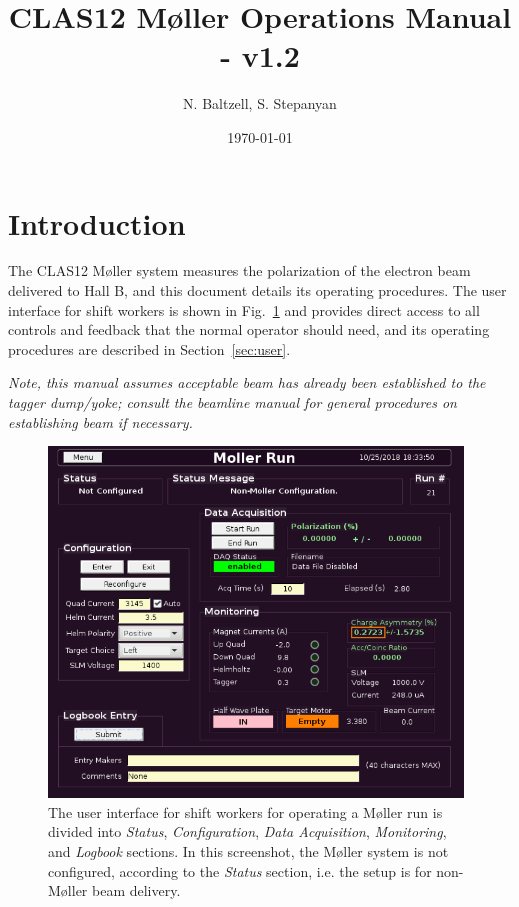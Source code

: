 \documentclass[amsmath,amssymb,notitlepage,12pt]{revtex4}
\begin{document}
\title{CLAS12 M{\o}ller Operations Manual - v1.2}
\date{\today}
\author{N. Baltzell, S. Stepanyan}
\begin{abstract}
\end{abstract}

\maketitle

\section{Introduction}
The CLAS12 M{\o}ller system measures the polarization of the electron beam delivered to Hall B, and this document details its operating procedures.  The user interface for shift workers is shown in Fig.~\ref{fig:unconfig} and provides direct access to all controls and feedback that the normal operator should need, and its operating procedures are described in Section~\ref{sec:user}.%

{\em Note, this manual assumes acceptable beam has already been established to the tagger dump/yoke;  consult the beamline manual for general procedures on establishing beam if necessary.}

\begin{figure}[htbp]\centering
    \includegraphics[width=11cm]{pics/unconfig}
    \caption{The user interface for shift workers for operating a M{\o}ller run is divided into {\em Status}, {\em Configuration}, {\em Data Acquisition}, {\em Monitoring}, and {\em Logbook} sections.  In this screenshot, the M{\o}ller system is not configured, according to the {\em Status} section, i.e. the setup is for non-M{\o}ller beam delivery.\label{fig:unconfig}}
\end{figure}
\end{document}

